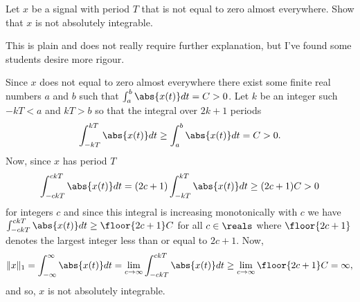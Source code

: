 \begin{excersizelist}
\item Let $x$ be a signal with period $T$ that is not equal to zero almost everywhere.  Show that $x$ is not absolutely integrable.
\begin{solution}
This is plain and does not really require further explanation, but I've found some students desire more rigour.  

Since $x$ does not equal to zero almost everywhere there exist some finite real numbers $a$ and $b$  such that $\int_{a}^b \abs{x(t)}dt = C > 0$.  Let $k$ be an integer such $-kT < a$ and $kT > b$ so that the integral over $2k+1$ periods 
\[
\int_{-kT}^{kT}\abs{x(t)}dt \geq \int_{a}^b \abs{x(t)}dt = C > 0.
\] 
Now, since $x$ has period $T$
\[
\int_{-ckT}^{ckT}\abs{x(t)}dt = (2c+1) \int_{-kT}^{kT}\abs{x(t)}dt \geq (2c+1)C > 0
\] 
for integers $c$ and since this integral is increasing monotonically with $c$ we have $\int_{-ckT}^{ckT}\abs{x(t)}dt \geq \floor{2c+1}C$ for all $c \in \reals$ where $\floor{2c+1}$ denotes the largest integer less than or equal to $2c+1$.  Now,
\[
\|x\|_1 = \int_{-\infty}^{\infty} \abs{x(t)} dt = \lim_{c \to \infty} \int_{-ckT}^{ckT}\abs{x(t)}dt \geq \lim_{c \to \infty} \floor{2c+1}C = \infty,
\]
and so, $x$ is not absolutely integrable.

\end{solution}

\end{excersizelist}

